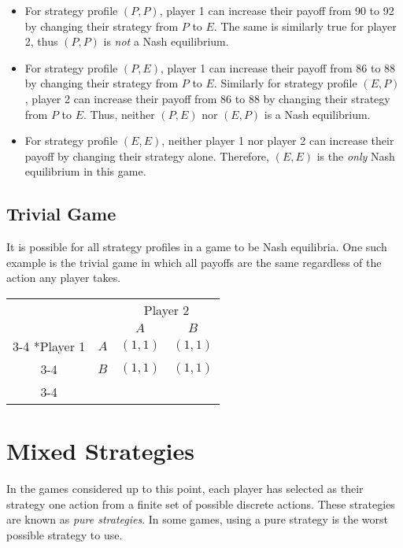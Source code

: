 \documentclass[twoside]{article}
\begin{document}
\begin{itemize}
\item For strategy profile $(P, P)$, player 1 can increase their payoff from 90 to 92 by changing their strategy from $P$ to $E$. The same is similarly true for player 2, thus $(P, P)$ is \textit{not} a Nash equilibrium.

\item For strategy profile $(P, E)$, player 1 can increase their payoff from 86 to 88 by changing their strategy from $P$ to $E$. Similarly for strategy profile $(E, P)$, player 2 can increase their payoff from 86 to 88 by changing their strategy from $P$ to $E$. Thus, neither $(P, E)$ nor $(E, P)$ is a Nash equilibrium.

\item For strategy profile $(E, E)$, neither player 1 nor player 2 can increase their payoff by changing their strategy alone. Therefore, $(E, E)$ is the \textit{only} Nash equilibrium in this game.
\end{itemize}

\subsection{Trivial Game}
It is possible for all strategy profiles in a game to be Nash equilibria. One such example is the trivial game in which all payoffs are the same regardless of the action any player takes.

\begin{table}[h]
\centering
\renewcommand{\arraystretch}{1.5}
\begin{tabular}{cr|c|c|}
& \multicolumn{1}{c}{} & \multicolumn{2}{c}{Player 2} \\
& \multicolumn{1}{c}{} & \multicolumn{1}{c}{$A$} & \multicolumn{1}{c}{$B$} \\ \cline{3-4}
\multirow{2}*{Player 1}  & $A$ & $(1, 1)$ & $(1, 1)$ \\ \cline{3-4}
& $B$ & $(1, 1)$ & $(1, 1)$ \\ \cline{3-4}
\end{tabular}
\end{table}

\section{Mixed Strategies}
In the games considered up to this point, each player has selected as their strategy one action from a finite set of possible discrete actions. These strategies are known as \textit{pure strategies}. In some games, using a pure strategy is the worst possible strategy to use.
\end{document}
